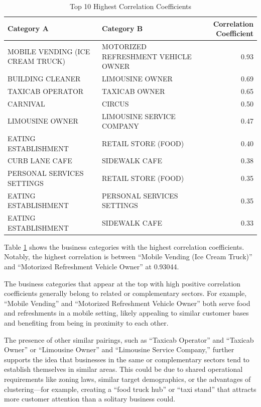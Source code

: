 \documentclass[
]{article}
\begin{document}
\begin{table}[H]

\caption{\label{tab:top10}Top 10 Highest Correlation Coefficients}
\centering
\fontsize{10}{12}\selectfont
\begin{tabular}[t]{>{\raggedright\arraybackslash}p{6cm}>{\raggedright\arraybackslash}p{6cm}r}
\toprule
Category A & Category B & Correlation Coefficient\\
\midrule
MOBILE VENDING (ICE CREAM TRUCK) & MOTORIZED REFRESHMENT VEHICLE OWNER & 0.93\\
BUILDING CLEANER & LIMOUSINE OWNER & 0.69\\
TAXICAB OPERATOR & TAXICAB OWNER & 0.65\\
CARNIVAL & CIRCUS & 0.50\\
LIMOUSINE OWNER & LIMOUSINE SERVICE COMPANY & 0.47\\
EATING ESTABLISHMENT & RETAIL STORE (FOOD) & 0.40\\
CURB LANE CAFE & SIDEWALK CAFE & 0.38\\
PERSONAL SERVICES SETTINGS & RETAIL STORE (FOOD) & 0.35\\
EATING ESTABLISHMENT & PERSONAL SERVICES SETTINGS & 0.35\\
EATING ESTABLISHMENT & SIDEWALK CAFE & 0.33\\
\bottomrule
\end{tabular}
\end{table}

Table \ref{tab:top10} shows the business categories with the highest correlation coefficients. Notably, the highest correlation is between ``Mobile Vending (Ice Cream Truck)'' and ``Motorized Refreshment Vehicle Owner'' at 0.93044.

The business categories that appear at the top with high positive correlation coefficients generally belong to related or complementary sectors. For example, ``Mobile Vending'' and ``Motorized Refreshment Vehicle Owner'' both serve food and refreshments in a mobile setting, likely appealing to similar customer bases and benefiting from being in proximity to each other.

The presence of other similar pairings, such as ``Taxicab Operator'' and ``Taxicab Owner'' or ``Limousine Owner'' and ``Limousine Service Company,'' further supports the idea that businesses in the same or complementary sectors tend to establish themselves in similar areas. This could be due to shared operational requirements like zoning laws, similar target demographics, or the advantages of clustering---for example, creating a ``food truck hub'' or ``taxi stand'' that attracts more customer attention than a solitary business could.
\end{document}
